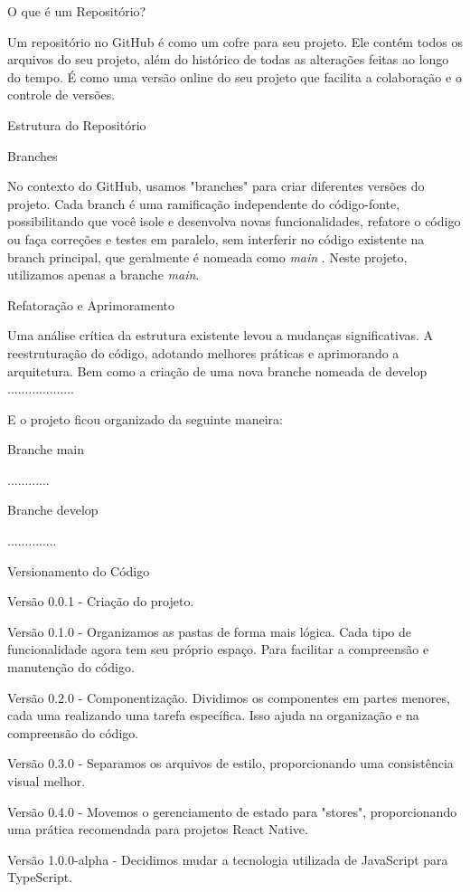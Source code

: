 O que é um Repositório?

Um repositório no GitHub é como um cofre para seu projeto. Ele contém todos os arquivos do seu projeto, além do histórico de todas as alterações feitas ao longo do tempo. É como uma versão online do seu projeto que facilita a colaboração e o controle de versões.

Estrutura do Repositório

Branches

No contexto do GitHub, usamos "branches" para criar diferentes versões do projeto. Cada branch é uma ramificação independente do código-fonte, possibilitando que você isole e desenvolva novas funcionalidades, refatore o código ou faça correções e testes em paralelo, sem interferir no código existente na branch principal, que geralmente é nomeada como \textit{main} \cite{al}. Neste projeto, utilizamos apenas a branche \textit{main}.


Refatoração e Aprimoramento

Uma análise crítica da estrutura existente levou a mudanças significativas. A reestruturação do código, adotando melhores práticas e aprimorando a arquitetura. Bem como a criação de uma nova branche nomeada de develop ...................

E o projeto ficou organizado da seguinte maneira: 

Branche main

............

Branche develop

..............

Versionamento do Código

Versão 0.0.1 -  Criação do projeto.

Versão 0.1.0 - Organizamos as pastas de forma mais lógica. Cada tipo de funcionalidade agora tem seu próprio espaço. Para facilitar a compreensão e manutenção do código.

Versão 0.2.0 - Componentização. Dividimos os componentes em partes menores, cada uma realizando uma tarefa específica. Isso ajuda na organização e na compreensão do código.

Versão 0.3.0 - Separamos os arquivos de estilo, proporcionando uma consistência visual melhor.

Versão 0.4.0 - Movemos o gerenciamento de estado para "stores", proporcionando uma prática recomendada para projetos React Native.

Versão 1.0.0-alpha - Decidimos mudar a tecnologia utilizada de JavaScript para TypeScript.


